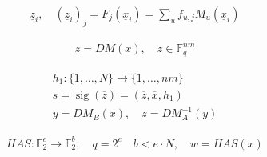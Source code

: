 \documentclass[12pt]{article}
\begin{document}
\begin{gather*}
\underline{z}_i,\quad (\underline{z}_i)_j=F_j(\underline{x}_i)=\sum_u f_{u,j} M_u(\underline{x}_i)
\end{gather*}

\begin{gather*}
\underline{z}=DM(\overline{x}),\quad \underline{z}\in\mathbb{F}_q^{nm}
\end{gather*}

\begin{gather*}
h_1:\{1,\dots,N\}\to\{1,\dots,nm\}\\
s=\operatorname{sig}(\overline{z})=(\overline{z},\overline{x},h_1)\\
\overline{y}=DM_B(\overline{x}),\quad \overline{z}=DM_A^{-1}(\overline{y})
\end{gather*}

\begin{gather*}
HAS:\mathbb{F}_2^e\to\mathbb{F}_2^b,\quad q=2^e\quad b<e\cdot N,\quad w=HAS(x)
\end{gather*}
\end{document}

